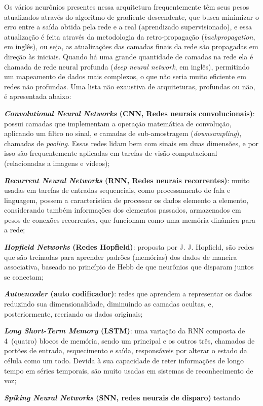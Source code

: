 Os vários neurônios presentes nessa arquitetura frequentemente têm seus pesos atualizados através do algoritmo de gradiente descendente, que busca minimizar o erro entre a saída obtida pela rede e a real (aprendizado supervisionado), e essa atualização é feita através da metodologia da retro-propagação (\textit{backpropagation}, em inglês), ou seja, as atualizações das camadas finais da rede são propagadas em direção às iniciais.
Quando há uma grande quantidade de camadas na rede ela é chamada de rede neural profunda (\textit{deep neural network}, em inglês), permitindo um mapeamento de dados mais complexos, o que não seria muito eficiente em redes não profundas. Uma lista não exaustiva de arquiteturas, profundas ou não, é apresentada abaixo:
\begin{alineas}
	\item \textbf{\textit{Convolutional Neural Networks} (CNN, Redes neurais convolucionais)}: possui camadas que implementam a operação matemática de convolução, aplicando um filtro no sinal, e camadas de sub-amostragem (\textit{downsampling}), chamadas de \textit{pooling}. Essas redes lidam bem com sinais em duas dimensões, e por isso são frequentemente aplicadas em tarefas de visão computacional (relacionadas a imagens e vídeos);
	\item \textbf{\textit{Recurrent Neural Networks} (RNN, Redes neurais recorrentes)}: muito usadas em tarefas de entradas sequenciais, como processamento de fala e linguagem, possem a característica de processar os dados elemento a elemento, considerando também informações dos elementos passados, armazenados em pesos de conexões recorrentes, que funcionam como uma memória dinâmica para a rede;
	\item \textbf{\textit{Hopfield Networks} (Redes Hopfield)}: proposta por J. J. Hopfield, são redes que são treinadas para aprender padrões (memórias) dos dados de maneira associativa, baseado no princípio de Hebb de que neurônios que disparam juntos se conectam;
	\item \textbf{\textit{Autoencoder} (auto codificador)}: redes que aprendem a representar os dados reduzindo sua dimensionalidade, diminuindo as camadas ocultas, e, posteriormente, recriando os dados originais;
	\item \textbf{\textit{Long Short-Term Memory} (LSTM)}: uma variação da RNN composta de 4~(quatro) blocos de memória, sendo um principal e os outros três, chamados de portões de entrada, esquecimento e saída, responsáveis por alterar o estado da célula como um todo.
	Devida à sua capacidade de reter informações de longo tempo em séries temporais, são muito usadas em sistemas de reconhecimento de voz;
	\item \textbf{\textit{Spiking Neural Networks} (SNN, redes neurais de disparo)} testando
\end{alineas}

